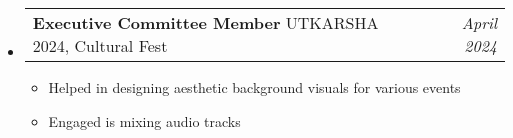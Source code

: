 \documentclass[a4paper,11pt]{article}
\makeatletter
\newcommand{\resumePOR}[3]{
\vspace{0.5mm}\item
    \begin{tabular*}{0.97\textwidth}[t]{l@{\extracolsep{\fill}}r}
        \textbf{#1}\hspace{0.3mm}#2 & \textit{\small{#3}} 
    \end{tabular*}
    \vspace{-2mm}
}
\newcommand{\resumeSubHeadingListStart}{\begin{itemize}[leftmargin=*,labelsep=0mm]}
\newcommand{\resumeItemListStart}{\begin{justify}\begin{itemize}[leftmargin=3ex, rightmargin=2ex, noitemsep,labelsep=1.2mm,itemsep=0mm]\small}
\newcommand{\resumeSubHeadingListEnd}{\end{itemize}\vspace{2mm}}
\newcommand{\resumeItemListEnd}{\end{itemize}\end{justify}\vspace{-2mm}}
\makeatother
\begin{document}
\vspace{-0.4mm}
\resumeSubHeadingListStart
\resumePOR{Executive Committee Member } %
    {UTKARSHA 2024, Cultural Fest} %
    {April 2024} %
    \resumeItemListStart
    \item {Helped in designing aesthetic background visuals for various events}
    \item {Engaged is mixing audio tracks}
    \resumeItemListEnd

\resumeSubHeadingListEnd
\vspace{-5mm}




    



\end{document}
